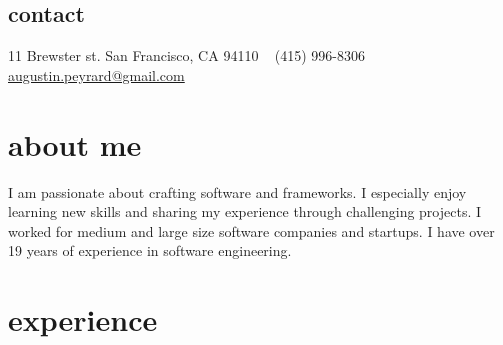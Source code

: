 \documentclass[]{k-cv} %
\begin{document}


\begin{aside} %
\section{contact}
11 Brewster st.
San Francisco, CA 94110
~
(415) 996-8306
~
\href{mailto:augustin.peyrard@gmail.com}{augustin.peyrard@gmail.com}
\end{aside}


\section{about me}
\begin{freetext}
{I am passionate about crafting software and frameworks.
I especially enjoy learning new skills and sharing my experience through challenging projects.
I worked for medium and large size software companies and startups.
I have over 19 years of experience in software engineering.}
\end{freetext}

\section{experience}
\end{document}
